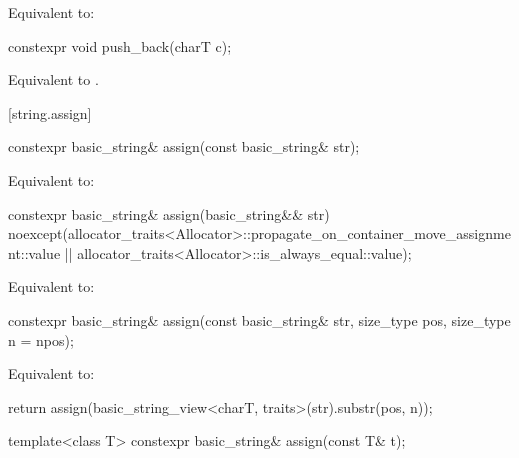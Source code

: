 \begin{itemdescr}
\pnum
\effects
Equivalent to: 
\end{itemdescr}

%
\begin{itemdecl}
constexpr void push_back(charT c);
\end{itemdecl}

\begin{itemdescr}
\pnum
\effects
Equivalent to
.
\end{itemdescr}

[string.assign]{}

%
\begin{itemdecl}
constexpr basic_string& assign(const basic_string& str);
\end{itemdecl}

\begin{itemdescr}
\pnum
\effects
Equivalent to: 
\end{itemdescr}

%
\begin{itemdecl}
constexpr basic_string& assign(basic_string&& str)
  noexcept(allocator_traits<Allocator>::propagate_on_container_move_assignment::value ||
           allocator_traits<Allocator>::is_always_equal::value);
\end{itemdecl}

\begin{itemdescr}
\pnum
\effects
Equivalent to: 
\end{itemdescr}


%
\begin{itemdecl}
constexpr basic_string& assign(const basic_string& str, size_type pos, size_type n = npos);
\end{itemdecl}

\begin{itemdescr}
\pnum
\effects
Equivalent to:
\begin{codeblock}
return assign(basic_string_view<charT, traits>(str).substr(pos, n));
\end{codeblock}
\end{itemdescr}

%
\begin{itemdecl}
template<class T>
  constexpr basic_string& assign(const T& t);
\end{itemdecl}

